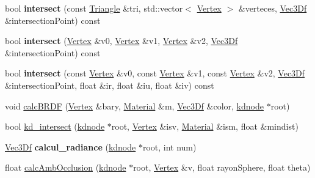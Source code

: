 \begin{DoxyCompactItemize}
\item 
\hypertarget{class_ray_ab4ef2d8047d3061177e803c6a3b4c55a}{
bool {\bfseries intersect} (const \hyperlink{class_triangle}{Triangle} \&tri, std::vector$<$ \hyperlink{class_vertex}{Vertex} $>$ \&verteces, \hyperlink{class_vec3_d}{Vec3Df} \&intersectionPoint) const }
\label{class_ray_ab4ef2d8047d3061177e803c6a3b4c55a}

\item 
\hypertarget{class_ray_a0f428b1df8e9ffb8c0685c24c5a02a62}{
bool {\bfseries intersect} (\hyperlink{class_vertex}{Vertex} \&v0, \hyperlink{class_vertex}{Vertex} \&v1, \hyperlink{class_vertex}{Vertex} \&v2, \hyperlink{class_vec3_d}{Vec3Df} \&intersectionPoint) const }
\label{class_ray_a0f428b1df8e9ffb8c0685c24c5a02a62}

\item 
\hypertarget{class_ray_ad58816dc53730f35e03b8b738085e586}{
bool {\bfseries intersect} (const \hyperlink{class_vertex}{Vertex} \&v0, const \hyperlink{class_vertex}{Vertex} \&v1, const \hyperlink{class_vertex}{Vertex} \&v2, \hyperlink{class_vec3_d}{Vec3Df} \&intersectionPoint, float \&ir, float \&iu, float \&iv) const }
\label{class_ray_ad58816dc53730f35e03b8b738085e586}

\item 
void \hyperlink{class_ray_a08e5a153b888c634ffcf6ba48fcaa5d9}{calcBRDF} (\hyperlink{class_vertex}{Vertex} \&bary, \hyperlink{class_material}{Material} \&m, \hyperlink{class_vec3_d}{Vec3Df} \&color, \hyperlink{classkdnode}{kdnode} $\ast$root)
\item 
bool \hyperlink{class_ray_acefd27e81e60869cdbb8c2e4e41e930c}{kd\_\-intersect} (\hyperlink{classkdnode}{kdnode} $\ast$root, \hyperlink{class_vertex}{Vertex} \&isv, \hyperlink{class_material}{Material} \&ism, float \&mindist)
\item 
\hypertarget{class_ray_a62c0f1bccd99236e718ff3b5d1dc755d}{
\hyperlink{class_vec3_d}{Vec3Df} {\bfseries calcul\_\-radiance} (\hyperlink{classkdnode}{kdnode} $\ast$root, int num)}
\label{class_ray_a62c0f1bccd99236e718ff3b5d1dc755d}

\item 
float \hyperlink{class_ray_a3ba68b6180f49a8949d54f8e0f70af0a}{calcAmbOcclusion} (\hyperlink{classkdnode}{kdnode} $\ast$root, \hyperlink{class_vertex}{Vertex} \&v, float rayonSphere, float theta)
\end{DoxyCompactItemize}


